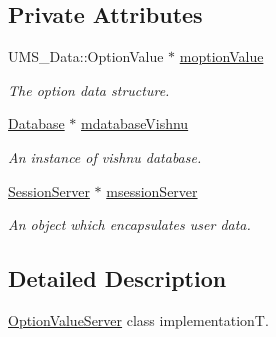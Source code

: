 \subsection*{Private Attributes}
\begin{DoxyCompactItemize}
\item 
\hypertarget{classOptionValueServer_afffe0327c43751ff0daa1b53b94be62f}{
UMS\_\-Data::OptionValue $\ast$ \hyperlink{classOptionValueServer_afffe0327c43751ff0daa1b53b94be62f}{moptionValue}}
\label{classOptionValueServer_afffe0327c43751ff0daa1b53b94be62f}

\begin{DoxyCompactList}\small\item\em The option data structure. \item\end{DoxyCompactList}\item 
\hypertarget{classOptionValueServer_a815114e58f01214f1b09c8d55bab5a53}{
\hyperlink{classDatabase}{Database} $\ast$ \hyperlink{classOptionValueServer_a815114e58f01214f1b09c8d55bab5a53}{mdatabaseVishnu}}
\label{classOptionValueServer_a815114e58f01214f1b09c8d55bab5a53}

\begin{DoxyCompactList}\small\item\em An instance of vishnu database. \item\end{DoxyCompactList}\item 
\hypertarget{classOptionValueServer_a7b01e99f3d94398360efeebec599f287}{
\hyperlink{classSessionServer}{SessionServer} $\ast$ \hyperlink{classOptionValueServer_a7b01e99f3d94398360efeebec599f287}{msessionServer}}
\label{classOptionValueServer_a7b01e99f3d94398360efeebec599f287}

\begin{DoxyCompactList}\small\item\em An object which encapsulates user data. \item\end{DoxyCompactList}\end{DoxyCompactItemize}


\subsection{Detailed Description}
\hyperlink{classOptionValueServer}{OptionValueServer} class implementationT. 

